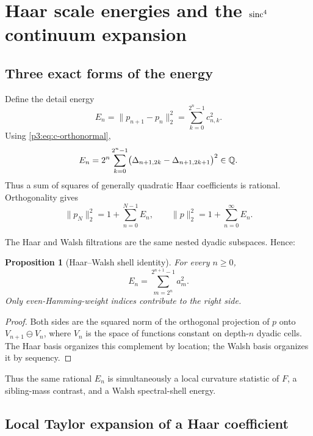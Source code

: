 \documentclass[11pt]{article}
\newtheorem{proposition}[theorem]{Proposition}
\theoremstyle{definition}
\theoremstyle{remark}
\begin{document}
\section{Haar scale energies and the $\operatorname{sinc}^4$ continuum expansion}
\label{p3:sec:haar-energy}

\subsection{Three exact forms of the energy}

Define the detail energy
\begin{equation}\label{p3:eq:En-def}
 E_n=\|p_{n+1}-p_n\|_2^2
 =\sum_{k=0}^{2^n-1}c_{n,k}^2.
\end{equation}
Using \eqref{p3:eq:c-orthonormal},
\begin{equation}\label{p3:eq:En-masses}
 E_n=2^n\sum_{k=0}^{2^n-1}
 \bigl(\Delta_{n+1,2k}-\Delta_{n+1,2k+1}\bigr)^2\in\mathbb Q.
\end{equation}
Thus a sum of squares of generally quadratic Haar coefficients is rational.
Orthogonality gives
\begin{equation}\label{p3:eq:L2-energy-telescope}
 \|p_N\|_2^2=1+\sum_{n=0}^{N-1}E_n,
 \qquad
 \|p\|_2^2=1+\sum_{n=0}^\infty E_n.
\end{equation}

The Haar and Walsh filtrations are the same nested dyadic subspaces.  Hence:

\begin{proposition}[Haar--Walsh shell identity]
\label{p3:prop:Haar-Walsh-shell}
For every $n\ge0$,
\begin{equation}\label{p3:eq:Haar-Walsh-energy}
 E_n=\sum_{m=2^n}^{2^{n+1}-1}a_m^2.
\end{equation}
Only even-Hamming-weight indices contribute to the right side.
\end{proposition}

\begin{proof}
Both sides are the squared norm of the orthogonal projection of $p$ onto
$V_{n+1}\ominus V_n$, where $V_n$ is the space of functions constant on
depth-$n$ dyadic cells.  The Haar basis organizes this complement by location;
the Walsh basis organizes it by sequency.
\end{proof}

Thus the same rational $E_n$ is simultaneously a local curvature statistic of
$F$, a sibling-mass contrast, and a Walsh spectral-shell energy.

\subsection{Local Taylor expansion of a Haar coefficient}
\end{document}
